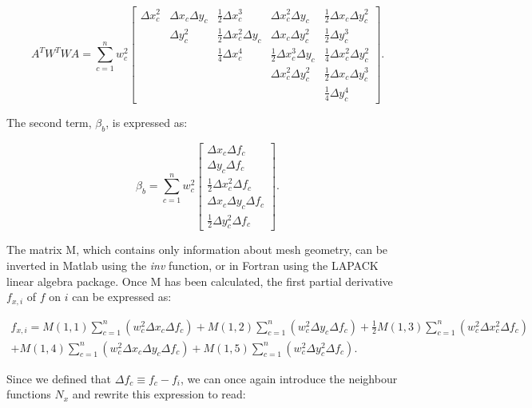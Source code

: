 \documentclass{article}
\begin{document}
\begin{equation} \label{eq:disc_LSATWTWA}
A^T W^T W A = \sum_{c=1}^n w_c^2
\begin{bmatrix}
\Delta x_c^2 & \Delta x_c \Delta y_c & \frac12 \Delta x_c^3 & \Delta x_c^2 \Delta y_c & \frac12 \Delta x_c \Delta y_c^2 \\
 & \Delta y_c^2 & \frac12 \Delta x_c^2 \Delta y_c & \Delta x_c \Delta y_c^2 & \frac12 \Delta y_c^3 \\ 
 & & \frac14 \Delta x_c^4 & \frac12 \Delta x_c^3 \Delta y_c & \frac14 \Delta x_c^2 \Delta y_c^2 \\ 
 & & & \Delta x_c^2 \Delta y_c^2 & \frac12 \Delta x_c \Delta y_c^3 \\
 & & & & \frac14 \Delta y_c^4
\end{bmatrix}.
\end{equation}

The second term, $\beta_b$, is expressed as:

\begin{equation} \label{eq:disc_LSbetab}
\beta_b = \sum_{c=1}^n w_c^2
\begin{bmatrix}
\Delta x_c \Delta f_c \\ \Delta y_c \Delta f_c \\ \frac12 \Delta x_c^2 \Delta f_c \\ \Delta x_c \Delta y_c \Delta f_c \\ \frac12 \Delta y_c^2 \Delta f_c
\end{bmatrix}.
\end{equation}

The matrix M, which contains only information about mesh geometry, can be inverted in Matlab using the \textit{inv} function, or in Fortran using the LAPACK linear algebra package. Once M has been calculated, the first partial derivative $f_{x,i}$ of $f$ on $i$ can be expressed as:

\begin{multline} \label{eq:disc_LSfxifyi}
f_{x,i} = M(1,1) \sum_{c=1}^n \left( w_c^2 \Delta x_c \Delta f_c \right) + 
             M(1,2) \sum_{c=1}^n \left( w_c^2 \Delta y_c \Delta f_c \right) + 
             \frac12 M(1,3) \sum_{c=1}^n \left( w_c^2 \Delta x_c^2 \Delta f_c \right) 
             \\ + M(1,4) \sum_{c=1}^n \left( w_c^2 \Delta x_c \Delta y_c \Delta f_c \right) +  
             M(1,5) \sum_{c=1}^n \left( w_c^2 \Delta y_c^2 \Delta f_c \right).
\end{multline}

Since we defined that $\Delta f_c \equiv f_c - f_i$, we can once again introduce the neighbour functions $N_x$ and rewrite this expression to read:
\end{document}
